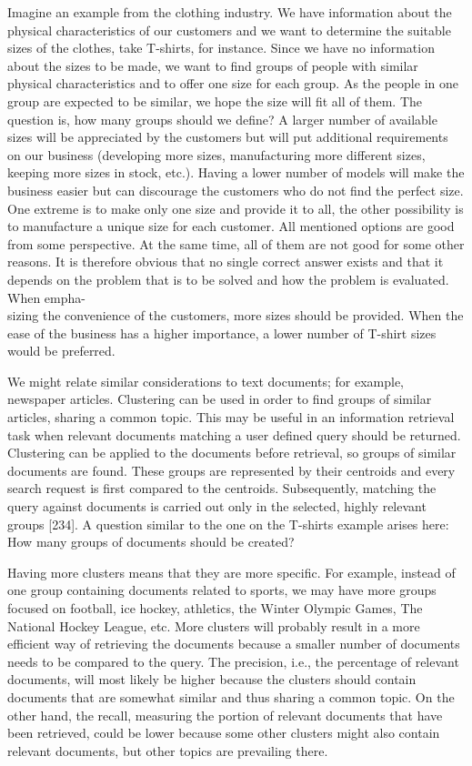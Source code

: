 \documentclass[10pt]{book}
\begin{document}
Imagine an example from the clothing industry. We have information about the physical characteristics of our customers and we want to determine the suitable sizes of the clothes, take T-shirts, for instance. Since we have no information about the sizes to be made, we want to find groups of people with similar physical characteristics and to offer one size for each group. As the people in one group are expected to be similar, we hope the size will fit all of them. The question is, how many groups should we define? A larger number of available sizes will be appreciated by the customers but will put additional requirements on our business (developing more sizes, manufacturing more different sizes, keeping more sizes in stock, etc.). Having a lower number of models will make the business easier but can discourage the customers who do not find the perfect size. One extreme is to make only one size and provide it to all, the other possibility is to manufacture a unique size for each customer. All mentioned options are good from some perspective. At the same time, all of them are not good for some other reasons. It is therefore obvious that no single correct answer exists and that it depends on the problem that is to be solved and how the problem is evaluated. When empha-\\
sizing the convenience of the customers, more sizes should be provided. When the ease of the business has a higher importance, a lower number of T-shirt sizes would be preferred.

We might relate similar considerations to text documents; for example, newspaper articles. Clustering can be used in order to find groups of similar articles, sharing a common topic. This may be useful in an information retrieval task when relevant documents matching a user defined query should be returned. Clustering can be applied to the documents before retrieval, so groups of similar documents are found. These groups are represented by their centroids and every search request is first compared to the centroids. Subsequently, matching the query against documents is carried out only in the selected, highly relevant groups [234]. A question similar to the one on the T-shirts example arises here: How many groups of documents should be created?

Having more clusters means that they are more specific. For example, instead of one group containing documents related to sports, we may have more groups focused on football, ice hockey, athletics, the Winter Olympic Games, The National Hockey League, etc. More clusters will probably result in a more efficient way of retrieving the documents because a smaller number of documents needs to be compared to the query. The precision, i.e., the percentage of relevant documents, will most likely be higher because the clusters should contain documents that are somewhat similar and thus sharing a common topic. On the other hand, the recall, measuring the portion of relevant documents that have been retrieved, could be lower because some other clusters might also contain relevant documents, but other topics are prevailing there.
\end{document}
